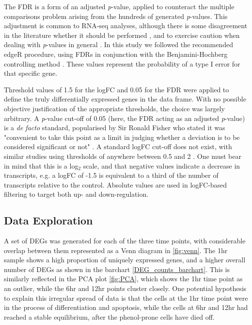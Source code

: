 The \ac{FDR} is a form of an adjusted \textit{p}-value, applied to counteract the multiple comparisons problem arising from the hundreds of generated \textit{p}-values. This adjustment is common to RNA-seq analyses, although there is some disagreement in the literature whether it should be performed \citep{rothman1990no, streiner2011correction}, and to exercise caution when dealing with \textit{p}-values in general \citep{gardner1986confidence, greenland2016statistical, vidgen2016p}. In this study we followed the recommended edgeR procedure, using \ac{FDR}s in conjunction with the Benjamini-Hochberg controlling method \citep{benjamini1995controlling}. These values represent the probability of a type I error for that specific gene. %


Threshold values of 1.5 for the \ac{logFC} and 0.05 for the \ac{FDR} were applied to define the truly differentially expressed genes in the data frame. With no possible objective justification of the appropriate thresholds, the choice was largely arbitrary. A \textit{p}-value cut-off of 0.05 (here, the \ac{FDR} acting as an adjusted \textit{p}-value) is a \textit{de facto} standard, popularised by Sir Ronald Fisher who stated it was "convenient to take this point as a limit in judging whether a deviation is to be considered significant or not" \citep{fisher1925statistical}. A standard \ac{logFC} cut-off does not exist, with similar studies using thresholds of anywhere between 0.5 and 2 \citep{zhao2018many, cardoso2019gene, handschuh2018gene}. One must bear in mind that this is a log$_2$ scale, and that negative values indicate a decrease in transcripts, e.g. a \ac{logFC} of -1.5 is equivalent to a third of the number of transcripts relative to the control. Absolute values are used in \ac{logFC}-based filtering to target both up- and down-regulation.

\subsection{Data Exploration}

A set of \ac{DEG}s was generated for each of the three time points, with considerable overlap between them represented as a Venn diagram in \autoref{fig:venn}. The 1hr sample shows a high proportion of uniquely expressed genes, and a higher overall number of \ac{DEG}s as shown in the barchart \autoref{DEG_counts_barchart}. This is similarly reflected in the PCA plot \autoref{fig:PCA}, which shows the 1hr time point as an outlier, while the 6hr and 12hr points cluster closely. One potential hypothesis to explain this irregular spread of data is that the cells at the 1hr time point were in the process of differentiation and apoptosis, while the cells at 6hr and 12hr had reached a stable equilibrium, after the phenol-prone cells have died off.

